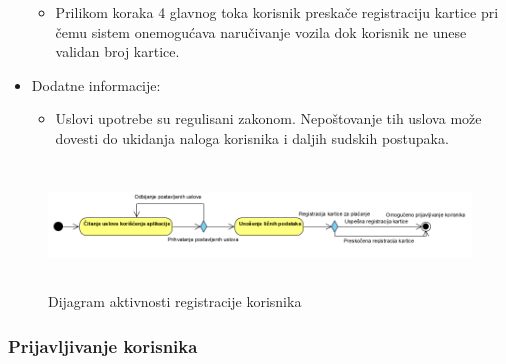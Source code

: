 \begin{itemize}
\begin{itemize}
            \item Prilikom koraka 4 glavnog toka korisnik preskače registraciju kartice pri čemu sistem onemogućava naručivanje vozila dok korisnik ne unese validan broj kartice.
        \end{itemize}
    \item Dodatne informacije:
        \begin{itemize}
            \item Uslovi upotrebe su regulisani zakonom. Nepoštovanje tih uslova može dovesti do ukidanja naloga korisnika i daljih sudskih postupaka.
        \end{itemize}
\end{itemize}


\begin{figure}[H]
\begin{left}
\includegraphics[width=480,height=125]{Slike/RegistracijaKorisnika.png}
\end{left}
    \caption{Dijagram aktivnosti registracije korisnika}
\label{fig:RegistracijaKorisnika}
\end{figure}


\subsubsection{\bfseries Prijavljivanje korisnika}

